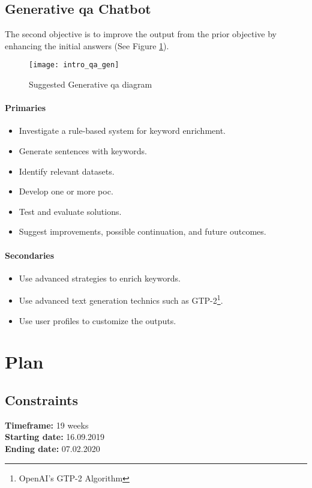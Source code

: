 \subsection*{Generative \gls{qa} Chatbot}
The second objective is to improve the output from the prior objective by enhancing the initial answers (See Figure \ref{fig:spec_qa_gen}).
\begin{figure}[ht!]
    \centering
    \texttt{[image: intro\_qa\_gen]}
    \caption{Suggested Generative \gls{qa} diagram}
    \label{fig:spec_qa_gen}
\end{figure}

\paragraph{Primaries}
\begin{itemize}[noitemsep]
    \item Investigate a rule-based system for keyword enrichment.
    \item Generate sentences with keywords.
    \item Identify relevant datasets.
    \item Develop one or more \gls{poc}.
    \item Test and evaluate solutions.
    \item Suggest improvements, possible continuation, and future outcomes.
\end{itemize}
\paragraph{Secondaries}
\begin{itemize}[noitemsep]
    \item Use advanced strategies to enrich keywords.
    \item Use advanced text generation technics such as GTP-2\footnote{OpenAI's GTP-2 Algorithm\cite{papers:gpt2}}.
    \item Use user profiles to customize the outputs.
\end{itemize}


\section*{Plan}
\label{plan:plan}
\subsection*{Constraints}
\textbf{Timeframe:} 19 weeks\\
\textbf{Starting date:} 16.09.2019\\
\textbf{Ending date:} 07.02.2020

